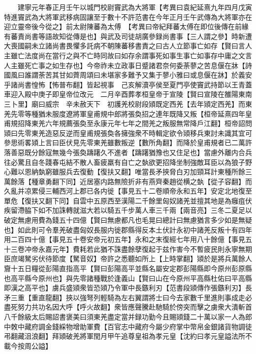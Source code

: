 　　建寧元年春正月壬午以城門校尉竇武為大將軍【考異曰袁紀延熹九年四月戊寅特進竇武為大將軍武移病固讓至于數十不許范書在今年正月壬午武傳為大將軍亦在迎立靈帝後今從之】前太尉陳蕃為太傅　【考異曰帝紀拜蕃太傅在即位後傳在前緣有蕃責尚書等語故知從傳是也】與武及司徒胡廣參録尚書事【三人謂之參】時新遭大喪國嗣未立諸尚書畏懼多託病不朝陳蕃移書責之曰古人立節事亡如存【賢曰言人主雖亡法度尚在當行之與不亡時同故曰如存余謂事死如事生事亡如事存中庸之文言人主雖死亡事之如生存也】今帝祚未立政事日蹙諸君奈何委荼蓼之苦息偃在牀【詩國風曰誰謂荼苦其甘如薺周頌曰未堪家多難予又集于蓼小雅曰或息偃在牀】於義安乎諸尚書惶怖【怖普布翻】皆起視事　己亥解瀆亭侯至夏門亭使竇武持節以王青蓋車迎入殿中庚子即皇帝位改元　二月辛酉葬孝桓皇帝于宣陵【賢曰宣陵在雒陽東南三卜里】廟曰威宗　辛未赦天下　初護羌校尉段熲既定西羌【去年熲定西羌】而東羌先零等種猶未服度遼將軍皇甫規中郎將張奐招之連年既降又叛【桓帝延熹四年皇甫規招降東羌六年規薦張奐至永康元年七年之間羌之叛服無常降戶江翻】桓帝詔問熲曰先零東羌造惡反逆而皇甫規張奐各擁強衆不時輯定欲令熲移兵東討未識其宜可參思術畧熲上言曰臣伏見先零東羌雖數叛逆【數所角翻】而降於皇甫規者已二萬許落善惡既分餘寇無幾今張奐躊躇久不進者【躊躇猶豫也又住足也】當慮外離内合兵往必驚且自冬踐春屯結不散人畜疲羸有自亡之埶欲更招降坐制強敵耳臣以為狼子野心難以恩納埶窮雖服兵去復動【復扶又翻】唯當長矛挾脅白刃加頸耳計東種所餘三萬餘落【種章勇翻下同】近居塞内路無險折非有燕齊秦趙從横之埶【從子容翻】而久亂并凉累侵三輔西河上郡已各内徙【事見五十二卷順帝永和五年】安定北地復至單危【復扶又翻下同】自雲中五原西至漢陽二千餘里匈奴諸羌並擅其地是為癰疽伏疾留滯脇下如不加誅轉就滋大若以騎五千步萬人車三千兩【兩音亮】三冬二夏足以破定無慮用費為錢五十四億【賢曰無慮都凡也毛晃曰總計曰無慮猶言多少如是無疑也】如此則可令羣羌破盡匈奴長服内徙郡縣得反本土伏計永初中諸羌反叛十有四年用二百四十億【事見五十卷安帝元初五年】永和之末復經七年用八十餘億【事見五十三卷冲帝永嘉元年】費耗若此猶不誅盡餘孽復起于兹作害今不暫疲民則永寧無期臣庶竭駑劣伏待節度【駑音奴】帝許之悉聽如所上【上時掌翻】熲於是將兵萬餘人齎十五日糧從彭陽直指高平【賢曰彭陽高平並縣名屬安定郡彭陽縣即今原州彭原縣也高平縣今原州也】與先零諸種戰於逢義山【賢曰山在今原州平高縣杜佑曰平高縣即漢之高平也】虜兵盛熲衆皆恐熲乃令軍中長鏃利刃【范書段熲傳作張鏃利刃】長矛三重【重直龍翻】挾以強弩列輕騎為左右翼謂將士曰今去家數千里進則事成走必盡死努力共功名因大呼【呼火故翻】衆皆應聲騰赴馳騎於傍突而擊之虜衆大潰斬首八千餘級太后賜詔書褒美曰須東羌盡定當并録功勤今且賜熲錢二十萬以家一人為郎中敇中藏府調金錢綵物增助軍費【百官志中藏府今屬少府掌中幣帛金銀諸貨物調徒弔翻藏沮浪翻】拜熲破羌將軍閏月甲午追尊皇祖為孝元皇【沈約曰孝元皇謚法所不載今按周公謚】

